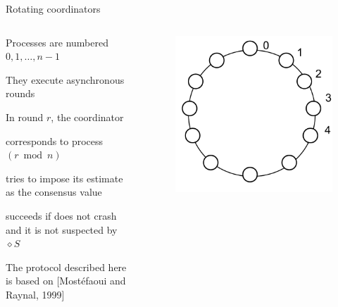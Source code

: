 \begin{frame}{Rotating coordinators}
	
\begin{columns}
\begin{column}{0.6\textwidth}
\BIL
\item Processes are numbered $0, 1, \ldots, n-1$
\item They execute asynchronous rounds
\item In round $r$, the coordinator
  \BI
  \item corresponds to process $(r \bmod n)$
  \item tries to impose its estimate as the consensus value
  \item succeeds if does not crash and it is not suspected by $\diamond S$
  \EI
\item The protocol described here is based on [Mostéfaoui and Raynal, 1999]
\EIL
\end{column}
\begin{column}{0.4\textwidth}
	\begin{figure}
		\begin{overprint}
			\includegraphics[width=\textwidth]{figs/07/rotating0}

\end{overprint}
\end{figure}
\end{column}
\end{columns}
\end{frame}
